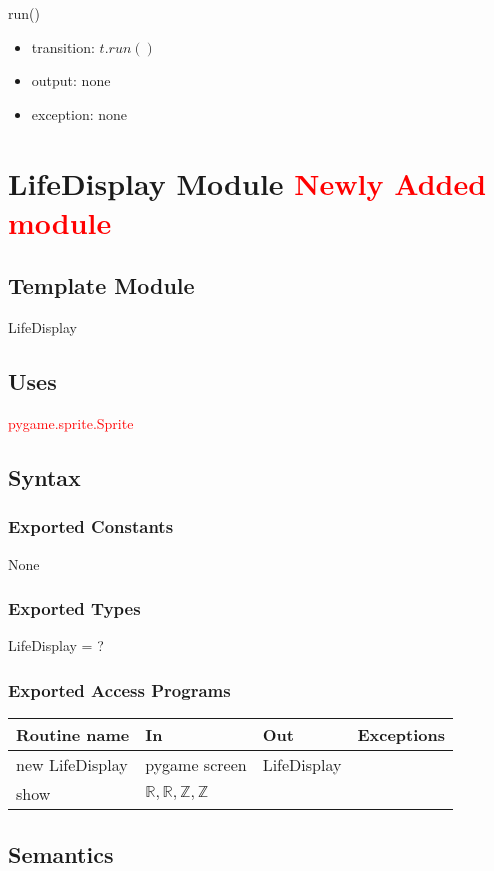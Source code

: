 \documentclass[12pt]{article}
\begin{document}
\noindent run()
\begin{itemize}
\item transition: $t.run()$
\item output: none
\item exception: none
\end{itemize}
\newpage


\section{LifeDisplay Module \textcolor{red}{Newly Added module}}

\subsection*{Template Module}
LifeDisplay

\subsection*{Uses}
\textcolor{red}{pygame.sprite.Sprite}


\subsection*{Syntax}
\subsubsection*{Exported Constants}
None
\subsubsection*{Exported Types}
LifeDisplay = ?
\subsubsection*{Exported Access Programs}
\begin{tabular}{| l | l | l | p{5cm} |}
\hline
\textbf{Routine name} & \textbf{In} & \textbf{Out} & \textbf{Exceptions}\\
\hline
new LifeDisplay & pygame screen & LifeDisplay & \\
\hline
show & $\mathbb{R}, \mathbb{R}, \mathbb{Z}, \mathbb{Z}$ &  & \\
\hline
\end{tabular}

\subsection*{Semantics}
\end{document}
